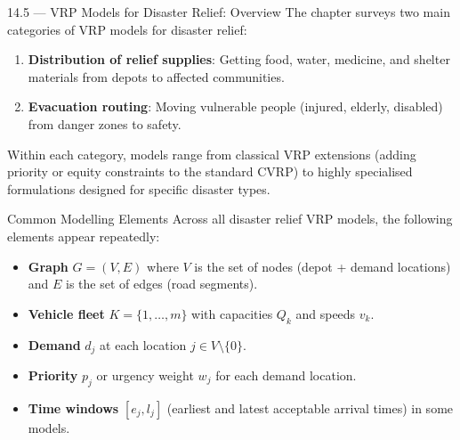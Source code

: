 \documentclass[aspectratio=169,10pt]{beamer}
\begin{document}
\begin{frame}[allowframebreaks]{14.5 --- VRP Models for Disaster Relief: Overview}
  The chapter surveys two main categories of VRP models for disaster
  relief:
  \begin{enumerate}
    \item \textbf{Distribution of relief supplies}: Getting food, water,
          medicine, and shelter materials from depots to affected
          communities.
    \item \textbf{Evacuation routing}: Moving vulnerable people
          (injured, elderly, disabled) from danger zones to safety.
  \end{enumerate}

  \medskip
  Within each category, models range from classical VRP extensions
  (adding priority or equity constraints to the standard CVRP) to
  highly specialised formulations designed for specific disaster types.

  \medskip
  \begin{block}{Common Modelling Elements}
    Across all disaster relief VRP models, the following elements
    appear repeatedly:
    \begin{itemize}
      \item \textbf{Graph} $G = (V, E)$ where $V$ is the set of nodes
            (depot + demand locations) and $E$ is the set of edges
            (road segments).
      \item \textbf{Vehicle fleet} $K = \{1, \ldots, m\}$ with
            capacities $Q_k$ and speeds $v_k$.
      \item \textbf{Demand} $d_j$ at each location $j \in V \setminus \{0\}$.
      \item \textbf{Priority} $p_j$ or urgency weight $w_j$ for each
            demand location.
      \item \textbf{Time windows} $[e_j, l_j]$ (earliest and latest
            acceptable arrival times) in some models.
    \end{itemize}
  \end{block}
\end{frame}
\end{document}
